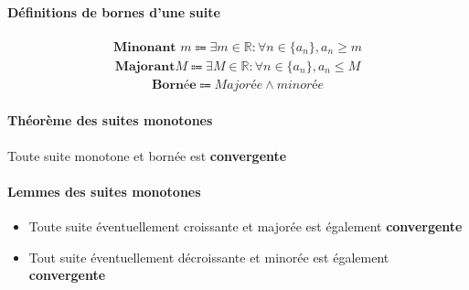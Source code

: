 \documentclass[2pt]{report}
\begin{document}
\begin{multicols*}{3}
    \paragraph{Définitions de bornes d'une suite}
       \begin{align*}
           \textbf{Minonant } m \Coloneqq 
           \exists m \in \mathbb{R} : \forall n \in \{ a_n \}, 
           a_n \geq m
       \end{align*}
       \begin{align*}
           \textbf{Majorant} M \Coloneqq 
           \exists M \in \mathbb{R} : \forall n \in \{ a_n \}, 
           a_n \leq M
       \end{align*}
       \begin{align*}
           \textbf{Bornée} \Coloneqq 
            \textit{Majorée} \land \textit{minorée}
       \end{align*}
       


    \paragraph{Théorème des suites monotones}
        Toute suite monotone et bornée est \textbf{convergente}  


    \paragraph{Lemmes des suites monotones}
        \begin{itemize}
            \item Toute suite éventuellement croissante et majorée 
        est également \textbf{convergente}  
            \item Tout suite éventuellement décroissante et 
            minorée est également \textbf{convergente}  
        \end{itemize}
    



\end{multicols*}
\end{document}
